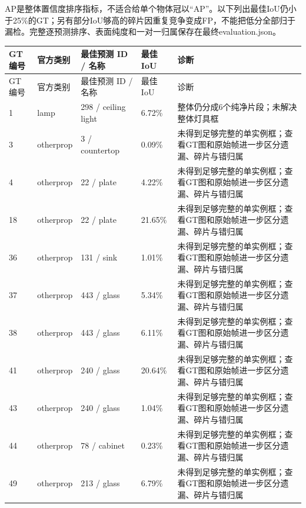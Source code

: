 \documentclass[UTF8,fontset=fandol]{ctexart}
\begin{document}
AP是整体置信度排序指标，不适合给单个物体冠以“AP”。以下列出最佳IoU仍小于25\%的GT；另有部分IoU够高的碎片因重复竞争变成FP，不能把低分全部归于漏检。完整逐预测排序、表面纯度和一对一归属保存在最终evaluation.json。



{\small
\begin{longtable}{|p{}|p{}|p{}|p{}|p{}|}
\hline
GT编号 & 官方类别 & 最佳预测 ID / 名称 & 最佳IoU & 诊断 \\ \hline
\endfirsthead
\hline
GT编号 & 官方类别 & 最佳预测 ID / 名称 & 最佳IoU & 诊断 \\ \hline
\endhead
1 & lamp & 298 / ceiling light & 6.72\% & 整体仍分成6个纯净片段；未解决整体灯具框 \\ \hline
3 & otherprop & 3 / countertop & 0.09\% & 未得到足够完整的单实例框；查看GT图和原始帧进一步区分遗漏、碎片与错归属 \\ \hline
4 & otherprop & 22 / plate & 4.22\% & 未得到足够完整的单实例框；查看GT图和原始帧进一步区分遗漏、碎片与错归属 \\ \hline
18 & otherprop & 22 / plate & 21.65\% & 未得到足够完整的单实例框；查看GT图和原始帧进一步区分遗漏、碎片与错归属 \\ \hline
36 & otherprop & 131 / sink & 1.01\% & 未得到足够完整的单实例框；查看GT图和原始帧进一步区分遗漏、碎片与错归属 \\ \hline
37 & otherprop & 443 / glass & 5.34\% & 未得到足够完整的单实例框；查看GT图和原始帧进一步区分遗漏、碎片与错归属 \\ \hline
38 & otherprop & 443 / glass & 6.11\% & 未得到足够完整的单实例框；查看GT图和原始帧进一步区分遗漏、碎片与错归属 \\ \hline
41 & otherprop & 240 / glass & 20.64\% & 未得到足够完整的单实例框；查看GT图和原始帧进一步区分遗漏、碎片与错归属 \\ \hline
43 & otherprop & 240 / glass & 1.04\% & 未得到足够完整的单实例框；查看GT图和原始帧进一步区分遗漏、碎片与错归属 \\ \hline
44 & otherprop & 78 / cabinet & 0.23\% & 未得到足够完整的单实例框；查看GT图和原始帧进一步区分遗漏、碎片与错归属 \\ \hline
49 & otherprop & 213 / glass & 6.79\% & 未得到足够完整的单实例框；查看GT图和原始帧进一步区分遗漏、碎片与错归属 \\ \hline

\end{longtable}}
\end{document}
